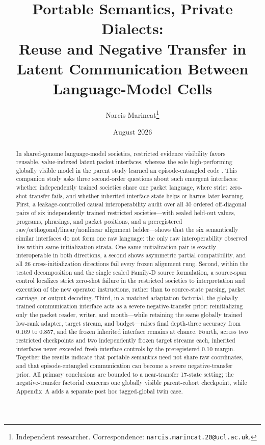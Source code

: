 \documentclass[11pt]{article}
\title{Portable Semantics, Private Dialects:\\ Reuse and Negative Transfer in Latent Communication Between Language-Model Cells}
\author{Narcis Marincat\thanks{Independent researcher. Correspondence: \texttt{narcis.marincat.20@ucl.ac.uk}.}}
\date{August 2026}
\begin{document}
\maketitle

\begin{abstract}
In shared-genome language-model societies, restricted evidence visibility favors reusable, value-indexed latent packet interfaces, whereas the sole high-performing globally visible model in the parent study learned an episode-entangled code \citep{marincat2026populus}. This companion study asks three second-order questions about such emergent interfaces: whether independently trained societies share one packet language, where strict zero-shot transfer fails, and whether inherited interface state helps or harms later learning. First, a leakage-controlled causal interoperability audit over all 30 ordered off-diagonal pairs of six independently trained restricted societies---with sealed held-out values, programs, phrasings, and packet positions, and a preregistered raw/orthogonal/linear/nonlinear alignment ladder---shows that the six semantically similar interfaces do not form one raw language: the only raw interoperability observed lies within same-initialization strata. One same-initialization pair is exactly interoperable in both directions, a second shows asymmetric partial compatibility, and all 26 cross-initialization directions fail every frozen alignment rung. Second, within the tested decomposition and the single sealed Family-D source formulation, a source-span control localizes strict zero-shot failure in the restricted societies to interpretation and execution of the new operator instructions, rather than to source-state parsing, packet carriage, or output decoding. Third, in a matched adaptation factorial, the globally trained communication interface acts as a severe negative-transfer prior: reinitializing only the packet reader, writer, and mouth---while retaining the same globally trained low-rank adapter, target stream, and budget---raises final depth-three accuracy from 0.169 to 0.857, and the frozen inherited interface remains at chance. Fourth, across two restricted checkpoints and two independently frozen target streams each, inherited interfaces never exceeded fresh-interface controls by the preregistered 0.10 margin. Together the results indicate that portable semantics need not share raw coordinates, and that episode-entangled communication can become a severe negative-transfer prior. All primary conclusions are bounded to a near-transfer 17-state setting; the negative-transfer factorial concerns one globally visible parent-cohort checkpoint, while Appendix~A adds a separate post hoc tagged-global twin case.
\end{abstract}
\end{document}
